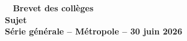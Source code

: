 \documentclass[12pt,a4paper,french]{article}
\begin{document}
\pagestyle{fancy}

\thispagestyle{empty}


\begin{center}
{\Large \textbf{
		\decofourleft~ Brevet des collèges ~\decofourright\\[10pt]
		Sujet\\[10pt]
		Série générale -- Métropole -- 30 juin 2026 }}
\end{center}
\end{document}
